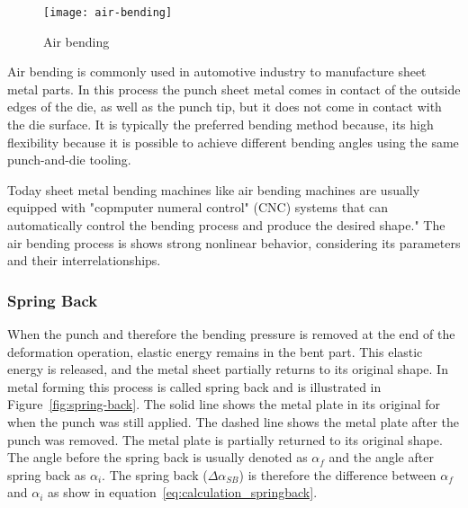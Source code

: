 \begin{figure}[H]
    \centering
    \texttt{[image: air-bending]}
    \caption{Air bending \cite[p. 416]{groover_fundamentalsmodernmanufacturing_2020}}
    \label{fig:air-bending}
\end{figure}

Air bending is commonly used in automotive industry to manufacture sheet metal parts. \cite[p.
342]{kim_predictionbendallowance_2007}
In this process the punch sheet metal comes in contact of the outside edges of the die, as well
as the punch tip, but it does not come in contact with the die surface.
It is typically the preferred bending method because, its high flexibility because it is possible
to achieve different bending angles using the same punch-and-die tooling.
\cite[p. 3]{miranda_formingspringbackprediction_2018}\cite[p.
1]{cruz_applicationmachinelearning_2021}

Today sheet metal bending machines like air bending machines are usually equipped with "copmputer
numeral control" (CNC) systems that can automatically control the bending process and produce the
desired shape." \cite[p. 3]{miranda_formingspringbackprediction_2018}
The air bending process is shows strong nonlinear behavior, considering its parameters and their
interrelationships. \cite[p. 3]{miranda_formingspringbackprediction_2018}


\subsubsection{Spring Back}
When the punch and therefore the bending pressure is removed at the end of the deformation
operation, elastic energy remains in the bent part. This elastic energy is released, and the
metal sheet partially returns to its original shape. \cite[p.
113-114]{groover_fundamentalsmodernmanufacturing_2020} In metal forming this process is called
spring back and is illustrated in Figure~\ref{fig:spring-back}.
The solid line shows the metal plate in its original for when the punch was still applied. The
dashed line shows the metal plate after the punch was removed. The metal plate is partially
returned to its original shape. The angle before the spring back is usually denoted as $\alpha_f$
and the angle after spring back as $\alpha_i$.
The spring back ($\Delta \alpha_{SB}$) is therefore the difference between $\alpha_f$ and
$\alpha_i$ as show in equation~\ref*{eq:calculation_springback}. \cite[p.
6]{cruz_applicationmachinelearning_2021}

